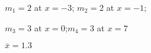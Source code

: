 {$m_1=2$  at $x=-3$; \quad $m_2=2$  at $x=-1$;\par $m_3=3$  at $x=0$;\quad $m_4=3$ at $x=7$
}
{$\overline{x}=1.3$
}